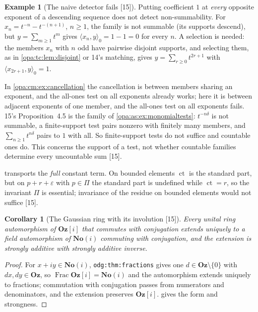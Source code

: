 \documentclass[11pt,oneside]{article}
\numberwithin{equation}{section}
\newtheorem{corollary}[corollary]{Corollary}
\theoremstyle{definition}
\newtheorem{example}[example]{Example}
\theoremstyle{remark}
\newcommand{\Oz}{\mathbf{Oz}}
\newcommand{\Og}{\mathbf{Oz}[i]}
\newcommand{\SC}{\mathbf{No}(i)}
\newcommand{\ct}{\operatorname{ct}}
\newcommand{\Frac}{\operatorname{Frac}}
\newcommand{\src}[1]{\textup{\textsf{\small[#1]}}}
\newcommand{\lbl}[1]{\nolinkurl{#1}}
\newcommand{\pairing}[2]{\langle #1,#2\rangle_0}
\begin{document}
\begin{example}[The naive detector fails \src{15}]\label{opa:tc:ex:naive}
Putting coefficient $1$ at \emph{every} opposite exponent of a descending sequence does not detect
non-summability. For $x_n=t^{-n}-t^{-(n+1)}$, $n\ge1$, the family is not summable (its supports descend),
but $y=\sum_{m\ge1}t^m$ gives $\pairing{x_n}y=1-1=0$ for every $n$. A selection is needed: the members $x_n$ with $n$ odd have pairwise disjoint supports, and
selecting them, as in \cref{opa:tc:lem:disjoint} or 14's matching, gives $y=\sum_{r\ge0}t^{2r+1}$ with
$\pairing{x_{2r+1}}y=1$.
\end{example}

In \cref{opa:cm:ex:cancellation} the cancellation is between members sharing an exponent, and the all-ones
test on all exponents already works; here it is between adjacent exponents of one member, and the
all-ones test on all exponents fails. 15's Proposition~4.5 is the family of
\cref{opa:as:ex:monomialtests}: $t^{-n\delta}$ is not summable, a finite-support test pairs nonzero with
finitely many members, and $\sum_{n\ge1}t^{n\delta}$ pairs to $1$ with all. So finite-support tests do not
suffice and countable ones do. This concerns the support of a test, not whether countable families
determine every uncountable sum \src{15}.

 transports the \emph{full} constant term. On bounded elements $\ct$ is the
standard part, but on $p+r+\varepsilon$ with $p\in\Pi$ the standard part is undefined while $\ct=r$, so the
invariant $\Pi$ is essential; invariance of the residue on bounded elements would not suffice \src{15}.

\begin{corollary}[The Gaussian ring with its involution \src{15}]\label{opa:tc:cor:ringinvolution}
Every unital ring automorphism of $\Og$ that commutes with conjugation extends uniquely to a field
automorphism of $\SC$ commuting with conjugation, and the extension is strongly additive with strongly
additive inverse.
\end{corollary}
\begin{proof}
For $x+iy\in\SC$, \lbl{odg:thm:fractions} gives one $d\in\Oz\setminus\{0\}$ with $dx,dy\in\Oz$, so $\Frac\Og=\SC$
and the automorphism extends uniquely to fractions; commutation with conjugation passes from numerators
and denominators, and the extension preserves $\Og$.  gives the form and
strongness.
\end{proof}
\end{document}
